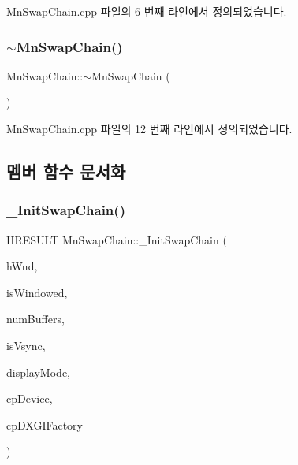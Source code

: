 Mn\+Swap\+Chain.\+cpp 파일의 6 번째 라인에서 정의되었습니다.

\mbox{\label{class_m_n_l_1_1_mn_swap_chain_a370e63efb36c734f501579499e419290}} 
\subsubsection{\texorpdfstring{$\sim$\+Mn\+Swap\+Chain()}{~MnSwapChain()}}
{\footnotesize\ttfamily Mn\+Swap\+Chain\+::$\sim$\+Mn\+Swap\+Chain (\begin{DoxyParamCaption}{ }\end{DoxyParamCaption})}



Mn\+Swap\+Chain.\+cpp 파일의 12 번째 라인에서 정의되었습니다.



\subsection{멤버 함수 문서화}
\mbox{\label{class_m_n_l_1_1_mn_swap_chain_a65a6275867f83674145948dfd9fc2e9f}} 
\subsubsection{\texorpdfstring{\+\_\+\+Init\+Swap\+Chain()}{\_InitSwapChain()}}
{\footnotesize\ttfamily H\+R\+E\+S\+U\+LT Mn\+Swap\+Chain\+::\+\_\+\+Init\+Swap\+Chain (\begin{DoxyParamCaption}\item[{H\+W\+ND}]{h\+Wnd,  }\item[{bool}]{is\+Windowed,  }\item[{U\+I\+NT}]{num\+Buffers,  }\item[{bool}]{is\+Vsync,  }\item[{const \hyperlink{struct_m_n_l_1_1_mn_display_mode}{Mn\+Display\+Mode} \&}]{display\+Mode,  }\item[{\hyperlink{namespace_m_n_l_a1eec210db8f309a4a9ac0d9658784c31}{C\+P\+D3\+D\+Device}}]{cp\+Device,  }\item[{\hyperlink{namespace_m_n_l_a8bb070ff80c5e3a874d942fbc31c22ab}{C\+P\+D\+X\+G\+I\+Factory}}]{cp\+D\+X\+G\+I\+Factory }\end{DoxyParamCaption})\hspace{0.3cm}{\ttfamily [private]}}



